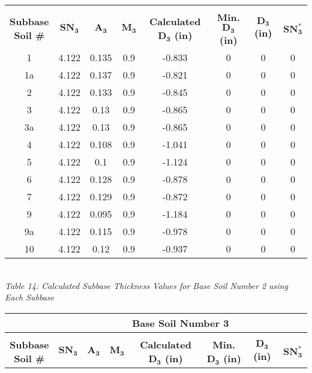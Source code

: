 \documentclass{article}
\begin{document}
\begin{center}
\begin{spacing}{1.6}
\begin{tabular}{|c|ccccccc|}
            &&&&&&&\\
             \shortstack[c]{\textbf{Subbase}\\\textbf{Soil \#}} & $\bm{SN_3}$ & $\bm{A_3}$ & $\bm{M_3}$ & \textbf{Calculated $\bm{D_3}$ (in)} & \textbf{Min. $\bm{D_3}$ (in)} & \textbf{$\bm{D_3}$ (in)} & $\bm{SN_3^*}$  \\\hline
             1  & 4.122 & 0.135 & 0.9 & -0.833 & 0 & 0&0  \\
             1a & 4.122 & 0.137 & 0.9 & -0.821 & 0 & 0&0  \\
             2  & 4.122 & 0.133 & 0.9 & -0.845 & 0 & 0&0  \\
             3  & 4.122 & 0.13  & 0.9 & -0.865 & 0 & 0&0  \\
             3a & 4.122 & 0.13  & 0.9 & -0.865 & 0 & 0&0  \\
             4  & 4.122 & 0.108 & 0.9 & -1.041 & 0 & 0&0  \\
             5  & 4.122 & 0.1   & 0.9 & -1.124 & 0 & 0&0  \\
             6  & 4.122 & 0.128 & 0.9 & -0.878 & 0 & 0&0  \\
             7  & 4.122 & 0.129 & 0.9 & -0.872 & 0 & 0&0  \\
             9  & 4.122 & 0.095 & 0.9 & -1.184 & 0 & 0&0  \\
             9a & 4.122 & 0.115 & 0.9 & -0.978 & 0 & 0&0  \\
             10 & 4.122 & 0.12  & 0.9 & -0.937 & 0 & 0&0\\\hline
        \end{tabular}
        \vspace{3mm}
        \emph{\\Table 14: Calculated Subbase Thickness Values for Base Soil Number 2 using Each Subbase\\}
        \newpage
        \begin{tabular}{|c|ccccccc|}
            \hline    
            \multicolumn{1}{|l}{}                     & \multicolumn{7}{c|}{\textbf{Base Soil Number 3}}                                              \\\hline
            &&&&&&&\\
             \shortstack[c]{\textbf{Subbase}\\\textbf{Soil \#}} & $\bm{SN_3}$ & $\bm{A_3}$ & $\bm{M_3}$ & \textbf{Calculated $\bm{D_3}$ (in)} & \textbf{Min. $\bm{D_3}$ (in)} & \textbf{$\bm{D_3}$ (in)} & $\bm{SN_3^*}$  \\\hline

\end{tabular}
\end{spacing}
\end{center}
\end{document}
